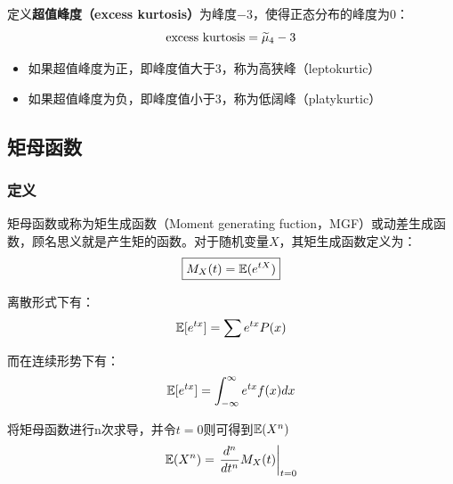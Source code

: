 \documentclass[11pt]{article}
\begin{document}
定义\textbf{超值峰度（excess kurtosis）}为峰度$-3$，使得正态分布的峰度为0：
\begin{equation*}
    \text{excess kurtosis} = \widetilde{\mu}_4-3
\end{equation*}
\begin{itemize}
    \item 如果超值峰度为正，即峰度值大于3，称为高狭峰（leptokurtic）
    \item 如果超值峰度为负，即峰度值小于3，称为低阔峰（platykurtic）
\end{itemize}

\subsection{矩母函数}

\subsubsection{定义}

矩母函数或称为矩生成函数（Moment generating fuction，MGF）或动差生成函数，顾名思义就是产生矩的函数。对于随机变量$X$，其矩生成函数定义为：
\begin{equation*}
    \boxed{
        M_X(t) = \mathbb{E}(e^{tX})
    }
\end{equation*}

离散形式下有：
\begin{equation*}
    \mathbb{E}[e^{tx}] = \sum e^{tx} P(x)
\end{equation*}

而在连续形势下有：
\begin{equation*}
    \mathbb{E}[e^{tx}] = \int_{-\infty}^{\infty} e^{tx} f(x) dx
\end{equation*}

\begin{thm}
    将矩母函数进行n次求导，并令$t=0$则可得到$\mathbb{E}(X^n)$
    \begin{equation*}
        \mathbb{E}(X^n) = \left. \frac{d^n}{dt^n} M_X(t) \right\vert_{t=0}
    \end{equation*}
\end{thm}
\end{document}
